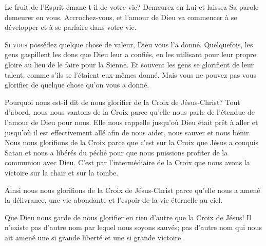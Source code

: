Le fruit de l'Esprit émane-t-il de votre vie? Demeurez en Lui et laissez Sa parole
 demeurer en vous. Accrochez-vous, et l'amour de Dieu va commencer
 à se développer et à se parfaire dans votre vie.

\dvrule







\lettrine{S}{i vous} possédez quelque chose de valeur,
 Dieu vous l'a donné. Quelquefois, les gens gaspillent les dons que Dieu
 leur a confiés, en les utilisant pour leur propre gloire au lieu
 de le faire pour la Sienne. Et souvent les gens se glorifient
 de leur talent, comme s'ils se l'étaient eux-mêmes donné.
 Mais vous ne pouvez pas vous glorifier de quelque chose qu'on vous a donné. 


Pourquoi nous est-il dit de nous glorifier de la Croix de Jésus-Christ?
 Tout d'abord, nous nous vantons de la Croix parce qu'elle nous parle
 de l'étendue de l'amour de Dieu pour nous. Elle nous rappelle jusqu'où Dieu
 était prêt à aller \ocadr et jusqu'où il est effectivement allé \fcadr{}
 afin de nous aider, nous sauver et nous bénir.
 Nous nous glorifions de la Croix parce que c'est sur la Croix que Jésus
 a conquis Satan et nous a libérés du péché pour que nous puissions
 profiter de la communion avec Dieu. C'est par l'intermédiaire de la Croix
 que nous avons la victoire sur la chair et sur la tombe.

Ainsi nous nous glorifions de la Croix de Jésus-Christ
 parce qu'elle nous a amené la délivrance, une vie abondante et l'espoir
 de la vie éternelle au ciel.

Que Dieu nous garde de nous glorifier en rien d'autre que la Croix de Jésus!
 Il n'existe pas d'autre nom par lequel nous soyons sauvés;
 pas d'autre nom qui nous ait amené une si grande liberté
 et une si grande victoire.

